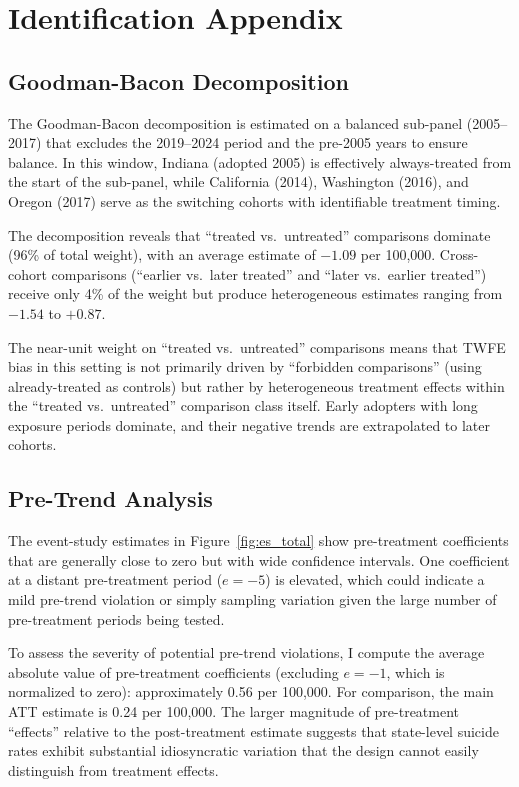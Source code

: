 \documentclass[12pt]{article}
\begin{document}
\section{Identification Appendix}
\label{sec:id_appendix}

\subsection{Goodman-Bacon Decomposition}

The Goodman-Bacon decomposition is estimated on a balanced sub-panel (2005--2017) that excludes the 2019--2024 period and the pre-2005 years to ensure balance. In this window, Indiana (adopted 2005) is effectively always-treated from the start of the sub-panel, while California (2014), Washington (2016), and Oregon (2017) serve as the switching cohorts with identifiable treatment timing.

The decomposition reveals that ``treated vs.\ untreated'' comparisons dominate (96\% of total weight), with an average estimate of $-1.09$ per 100,000. Cross-cohort comparisons (``earlier vs.\ later treated'' and ``later vs.\ earlier treated'') receive only 4\% of the weight but produce heterogeneous estimates ranging from $-1.54$ to $+0.87$.

The near-unit weight on ``treated vs.\ untreated'' comparisons means that TWFE bias in this setting is not primarily driven by ``forbidden comparisons'' (using already-treated as controls) but rather by heterogeneous treatment effects within the ``treated vs.\ untreated'' comparison class itself. Early adopters with long exposure periods dominate, and their negative trends are extrapolated to later cohorts.

\subsection{Pre-Trend Analysis}

The event-study estimates in Figure~\ref{fig:es_total} show pre-treatment coefficients that are generally close to zero but with wide confidence intervals. One coefficient at a distant pre-treatment period ($e = -5$) is elevated, which could indicate a mild pre-trend violation or simply sampling variation given the large number of pre-treatment periods being tested.

To assess the severity of potential pre-trend violations, I compute the average absolute value of pre-treatment coefficients (excluding $e = -1$, which is normalized to zero): approximately 0.56 per 100,000. For comparison, the main ATT estimate is 0.24 per 100,000. The larger magnitude of pre-treatment ``effects'' relative to the post-treatment estimate suggests that state-level suicide rates exhibit substantial idiosyncratic variation that the design cannot easily distinguish from treatment effects.
\end{document}
